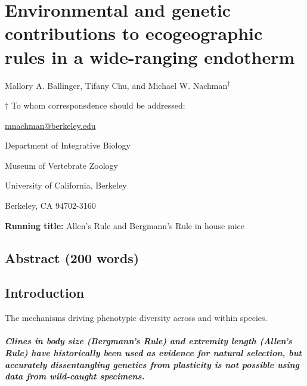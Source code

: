 \documentclass[]{article}
\author{}
\date{\vspace{-2.5em}}
\let\oldsubparagraph\subparagraph
\renewcommand{\subparagraph}[1]{\oldsubparagraph{#1}\mbox{}}
\begin{document}
\hypertarget{environmental-and-genetic-contributions-to-ecogeographic-rules-in-a-wide-ranging-endotherm}{%
\section{Environmental and genetic contributions to ecogeographic rules
in a wide-ranging
endotherm}\label{environmental-and-genetic-contributions-to-ecogeographic-rules-in-a-wide-ranging-endotherm}}

\vspace{20mm}

Mallory A. Ballinger, Tifany Chu, and Michael W. Nachman\({^\dagger}\)

\vspace{40mm}

\({\dagger}\) To whom corresponsdence should be addressed:

\href{mailto:mnachman@berkeley.edu}{mnachman@berkeley.edu}

Department of Integrative Biology

Museum of Vertebrate Zoology

University of California, Berkeley

Berkeley, CA 94702-3160

\vspace{20mm}

\textbf{Running title:} Allen's Rule and Bergmann's Rule in house mice

\newpage

\hypertarget{abstract-200-words}{%
\subsection{Abstract (200 words)}\label{abstract-200-words}}

\newpage

\hypertarget{introduction}{%
\subsection{Introduction}\label{introduction}}

The mechanisms driving phenotypic diversity across and within species.

\hypertarget{clines-in-body-size-bergmanns-rule-and-extremity-length-allens-rule-have-historically-been-used-as-evidence-for-natural-selection-but-accurately-dissentangling-genetics-from-plasticity-is-not-possible-using-data-from-wild-caught-specimens.}{%
\subparagraph{\texorpdfstring{\textbf{Clines in body size (Bergmann's
Rule) and extremity length (Allen's Rule) have historically been used as
evidence for natural selection, but accurately dissentangling genetics
from plasticity is not possible using data from wild-caught
specimens.}}{Clines in body size (Bergmann's Rule) and extremity length (Allen's Rule) have historically been used as evidence for natural selection, but accurately dissentangling genetics from plasticity is not possible using data from wild-caught specimens.}}\label{clines-in-body-size-bergmanns-rule-and-extremity-length-allens-rule-have-historically-been-used-as-evidence-for-natural-selection-but-accurately-dissentangling-genetics-from-plasticity-is-not-possible-using-data-from-wild-caught-specimens.}}
\end{document}
